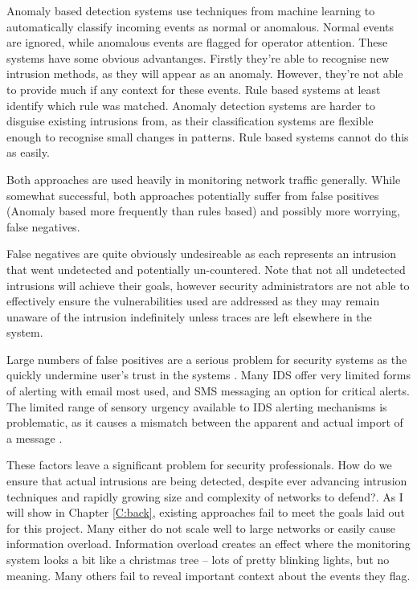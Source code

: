 Anomaly based detection systems use techniques from machine learning to automatically classify incoming events as normal or anomalous. Normal events are ignored, while anomalous events are flagged for operator attention. These systems have some obvious advantanges. Firstly they're able to recognise new intrusion methods, as they will appear as an anomaly. However, they're not able to provide much if any context for these events. Rule based systems at least identify which rule was matched. Anomaly detection systems are harder to disguise existing intrusions from, as their classification systems are flexible enough to recognise small changes in patterns. Rule based systems cannot do this as easily.

Both approaches are used heavily in monitoring network traffic generally. While somewhat successful, both approaches potentially suffer from false positives (Anomaly based more frequently than rules based) and possibly more worrying, false negatives. 

False negatives are quite obviously undesireable as each represents an intrusion that went undetected and potentially un-countered. Note that not all undetected intrusions will achieve their goals, however security administrators are not able to effectively ensure the vulnerabilities used are addressed as they may remain unaware of the intrusion indefinitely unless traces are left elsewhere in the system.

Large numbers of false positives are a serious problem for security systems as the quickly undermine user's trust in the systems \cite{stanton1994human}. Many IDS offer very limited forms of alerting with email most used, and SMS messaging an option for critical alerts. The limited range of sensory urgency available to IDS alerting mechanisms is problematic, as it causes a mismatch between the apparent and actual import of a message \cite{stanton1994human}. 

These factors leave a significant problem for security professionals. How do we ensure that actual intrusions are being detected, despite ever advancing intrusion techniques and rapidly growing size and complexity of networks to defend?. As I will show in Chapter \ref{C:back}, existing approaches fail to meet the goals laid out for this project. Many either do not scale well to large networks or easily cause information overload. Information overload creates an effect where the monitoring system looks a bit like a christmas tree -- lots of pretty blinking lights, but no meaning. Many others fail to reveal important context about the events they flag. 

